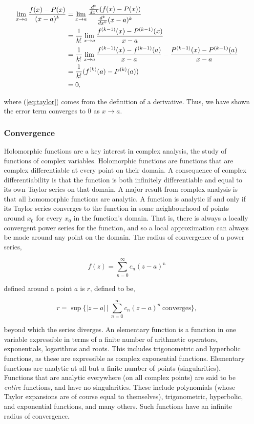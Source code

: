 \documentclass[11pt]{amsart}
\begin{document}
\begin{align}
\lim_{x \to a} \frac{f(x) - P(x)}{(x - a)^k} &= \lim_{x \to a} \frac{\frac{d^k}{dx^k}(f(x) - P(x))}{\frac{d^k}{dx^k}(x - a)^k} \notag \\
&= \frac{1}{k!}\lim_{x \to a} \frac{f^{(k-1)}(x) - P^{(k-1)}(x)}{x - a} \notag \\
&= \frac{1}{k!}\lim_{x \to a} \frac{f^{(k-1)}(x) - f^{(k-1)}(a)}{x - a} - \frac{P^{(k-1)}(x) - P^{(k-1)}(a)}{x - a} \notag \\
&= \frac{1}{k!}(f^{(k)}(a) - P^{(k)}(a)) \label{eq:taylor} \\
&= 0, \notag
\end{align}

where (\ref{eq:taylor}) comes from the definition of a derivative. Thus, we have shown the error term converges to 0 as $x \to a$.

\subsubsection{Convergence}

Holomorphic functions are a key interest in complex analysis, the study of functions of complex variables. Holomorphic functions are functions that are complex differentiable at every point on their domain. A consequence of complex differentiability is that the function is both infinitely differentiable and equal to its own Taylor series on that domain. A major result from complex analysis is that all homomorphic functions are analytic. A function is analytic if and only if its Taylor series converges to the function in some neighbourhood of points around $x_0$ for every $x_0$ in the function's domain. That is, there is always a locally convergent power series for the function, and so a local approximation can always be made around any point on the domain. The radius of convergence of a power series,

$$f(z) = \sum_{n=0}^{\infty}c_n(z - a)^n$$

defined around a point $a$ is $r$, defined to be,

$$r = \sup\Bigg\{|z - a| \ \Bigg| \ \sum_{n=0}^{\infty}c_n(z - a)^n \ \text{converges} \Bigg\},$$

beyond which the series diverges. An elementary function is a function in one variable expressible in terms of a finite number of arithmetic operators, exponentials, logarithms and roots. This includes trigonometric and hyperbolic functions, as these are expressible as complex exponential functions. Elementary functions are analytic at all but a finite number of points (singularities). Functions that are analytic everywhere (on all complex points) are said to be \emph{entire} functions, and have no singularities. These include polynomials (whose Taylor expansions are of course equal to themselves), trigonometric, hyperbolic, and exponential functions, and many others. Such functions have an infinite radius of convergence.
\end{document}
